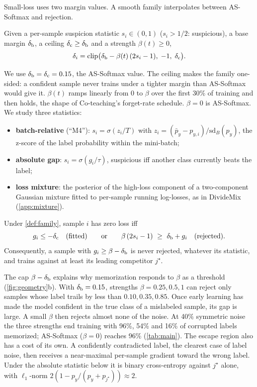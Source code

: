 Small-loss uses two margin values. A smooth family interpolates between AS-Softmax and rejection.

\begin{definition}
\label{def:family}
Given a per-sample suspicion statistic $s_i \in (0, 1)$ ($s_i > 1/2$: suspicious), a base margin
$\delta_{\mathrm{b}}$, a ceiling $\delta_{\mathrm{c}} \ge \delta_{\mathrm{b}}$ and a strength $\beta(t) \ge 0$,
\[
  \delta_i = \operatorname{clip}\!\big(\delta_{\mathrm{b}} - \beta(t)\,(2 s_i - 1),\; -1,\; \delta_{\mathrm{c}}\big).
\]
\end{definition}

We use $\delta_{\mathrm{b}} = \delta_{\mathrm{c}} = 0.15$, the AS-Softmax value. The ceiling makes the family one-sided: a
confident sample never trains under a tighter margin than AS-Softmax would give it. $\beta(t)$
ramps linearly from 0 to $\beta$ over the first 30\% of training and then holds, the shape of
Co-teaching's forget-rate schedule. $\beta = 0$ is AS-Softmax. We study three statistics:
\begin{itemize}
  \item \textbf{batch-relative} (``M4''): $s_i = \sigma(z_i / T)$ with
  $z_i = (\bar p_y - p_{y,i}) / \mathrm{sd}_B(p_y)$, the z-score of the label probability within
  the mini-batch;
  \item \textbf{absolute gap}: $s_i = \sigma(g_i / \tau)$, suspicious iff another class currently
  beats the label;
  \item \textbf{loss mixture}: the posterior of the high-loss component of a two-component Gaussian
  mixture fitted to per-sample running log-losses, as in DivideMix (\cref{app:mixture}).
\end{itemize}

\begin{proposition}
\label{prop:reject}
Under \cref{def:family}, sample $i$ has zero loss iff
\[
  g_i \le -\delta_{\mathrm{c}} \quad\text{(fitted)} \qquad\text{or}\qquad
  \beta\,(2 s_i - 1) \ \ge\ \delta_{\mathrm{b}} + g_i \quad\text{(rejected)}.
\]
Consequently, a sample with $g_i \ge \beta - \delta_{\mathrm{b}}$ is never rejected, whatever its statistic,
and trains against at least its leading competitor $j^\star$.
\end{proposition}

The cap $\beta - \delta_{\mathrm{b}}$ explains why memorization responds to $\beta$ as a threshold
(\cref{fig:geometry}b). With $\delta_{\mathrm{b}} = 0.15$, strengths $\beta = 0.25, 0.5, 1$ can reject only
samples whose label trails by less than $0.10, 0.35, 0.85$. Once early learning has made the model
confident in the true class of a mislabeled sample, its gap is large. A small $\beta$ then rejects
almost none of the noise. At 40\% symmetric noise the three strengths end training with 96\%,
54\% and 16\% of corrupted labels memorized; AS-Softmax ($\beta = 0$) reaches 96\%
(\cref{tab:main}). The escape region also has a cost of its own. A confidently contradicted
label, the clearest case of label noise, then receives a near-maximal per-sample gradient toward
the wrong label. Under the absolute statistic below it is binary cross-entropy against $j^\star$
alone, with $\ell_1$-norm $2(1 - p_y/(p_y + p_{j^\star})) \approx 2$.

